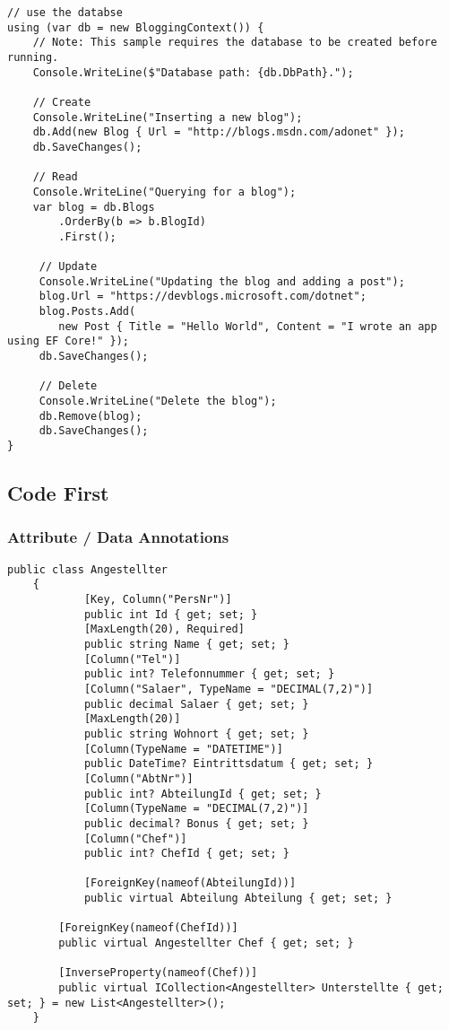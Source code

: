 \begin{lstlisting}
// use the databse
using (var db = new BloggingContext()) {
	// Note: This sample requires the database to be created before running.
    Console.WriteLine($"Database path: {db.DbPath}.");
                
    // Create
    Console.WriteLine("Inserting a new blog");
    db.Add(new Blog { Url = "http://blogs.msdn.com/adonet" });
    db.SaveChanges();

    // Read
    Console.WriteLine("Querying for a blog");
    var blog = db.Blogs
    	.OrderBy(b => b.BlogId)
        .First();

     // Update
     Console.WriteLine("Updating the blog and adding a post");
     blog.Url = "https://devblogs.microsoft.com/dotnet";
     blog.Posts.Add(
     	new Post { Title = "Hello World", Content = "I wrote an app using EF Core!" });
     db.SaveChanges();

     // Delete
     Console.WriteLine("Delete the blog");
     db.Remove(blog);
     db.SaveChanges();
}
\end{lstlisting}

\subsection{Code First}
\subsubsection{Attribute / Data Annotations}
\begin{lstlisting}
public class Angestellter
	{
            [Key, Column("PersNr")]
            public int Id { get; set; }
            [MaxLength(20), Required]
            public string Name { get; set; }
            [Column("Tel")]
            public int? Telefonnummer { get; set; }
            [Column("Salaer", TypeName = "DECIMAL(7,2)")]
            public decimal Salaer { get; set; }
            [MaxLength(20)]
            public string Wohnort { get; set; }
            [Column(TypeName = "DATETIME")]
            public DateTime? Eintrittsdatum { get; set; }
            [Column("AbtNr")]
            public int? AbteilungId { get; set; }
            [Column(TypeName = "DECIMAL(7,2)")]
            public decimal? Bonus { get; set; }
            [Column("Chef")]
            public int? ChefId { get; set; }

            [ForeignKey(nameof(AbteilungId))]
            public virtual Abteilung Abteilung { get; set; }

        [ForeignKey(nameof(ChefId))]
        public virtual Angestellter Chef { get; set; }

        [InverseProperty(nameof(Chef))]
        public virtual ICollection<Angestellter> Unterstellte { get; set; } = new List<Angestellter>();
	} 
\end{lstlisting}

